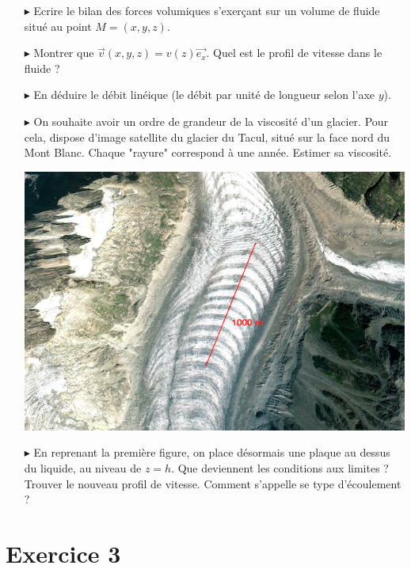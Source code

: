 \documentclass{report}
\begin{document}
\begin{itemize}

	\item[$\blacktriangleright$] Ecrire le bilan des forces volumiques s'exerçant sur un volume de fluide situé au point $M=(x,y,z)$.
	\item[$\blacktriangleright$] Montrer que $\vec{v}(x,y,z)=v(z)\vec{e_x}$. Quel est le profil de vitesse dans le fluide ? 
	\item[$\blacktriangleright$] En déduire le débit linéique (le débit par unité de longueur selon l'axe $y$).
	\item[$\blacktriangleright$] On souhaite avoir un ordre de grandeur de la viscosité d'un glacier. Pour cela, dispose d'image satellite du glacier du Tacul, situé sur la face nord du Mont Blanc. Chaque "rayure" correspond à une année. Estimer sa viscosité. 
	
\begin{center}
	\includegraphics[scale=1]{glacier.png}
\end{center}


	\item[$\blacktriangleright$] En reprenant la première figure, on place désormais une plaque au dessus du liquide, au niveau de $z=h$. Que deviennent les conditions aux limites ? Trouver le nouveau profil de vitesse. Comment s'appelle se type d'écoulement ?

\end{itemize}

\newpage

\section*{Exercice 3}
\end{document}
